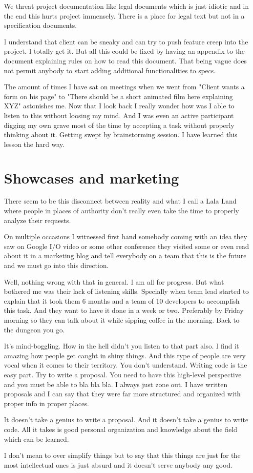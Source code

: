 We threat project documentation like legal documents which is just idiotic and in the end this hurts project immensely. There is a place for legal text but not in a specification documents.

I understand that client can be sneaky and can try to push feature creep into the project. I totally get it. But all this could be fixed by having an appendix to the document explaining rules on how to read this document. That being vague does not permit anybody to start adding additional functionalities to specs.

The amount of times I have sat on meetings when we went from "Client wants a form on his page" to "There should be a short animated film here explaining XYZ" astonishes me. Now that I look back I really wonder how was I able to listen to this without loosing my mind. And I was even an active participant digging my own grave most of the time by accepting a task without properly thinking about it. Getting swept by brainstorming session. I have learned this lesson the hard way.

\section{Showcases and marketing}

There seem to be this disconnect between reality and what I call a Lala Land where people in places of authority don’t really even take the time to properly analyze their requests.

On multiple occasions I witnessed first hand somebody coming with an idea they saw on Google I/O video or some other conference they visited some or even read about it in a marketing blog and tell everybody on a team that this is the future and we must go into this direction.

Well, nothing wrong with that in general. I am all for progress. But what bothered me was their lack of listening skills. Specially when team lead started to explain that it took them 6 months and a team of 10 developers to accomplish this task. And they want to have it done in a week or two. Preferably by Friday morning so they can talk about it while sipping coffee in the morning. Back to the dungeon you go.

It’s mind-boggling. How in the hell didn’t you listen to that part also. I find it amazing how people get caught in shiny things. And this type of people are very vocal when it comes to their territory. You don’t understand. Writing code is the easy part. Try to write a proposal. You need to have this high-level perspective and you must be able to bla bla bla. I always just zone out. I have written proposals and I can say that they were far more structured and organized with proper info in proper places.

It doesn’t take a genius to write a proposal. And it doesn’t take a genius to write code. All it takes is good personal organization and knowledge about the field which can be learned.

I don’t mean to over simplify things but to say that this things are just for the most intellectual ones is just absurd and it doesn’t serve anybody any good.

